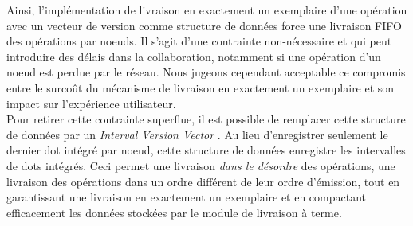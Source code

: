 Ainsi, l'implémentation de livraison en exactement un exemplaire d'une opération avec un vecteur de version comme structure de données force une livraison \ac{FIFO} des opérations par noeuds.
Il s'agit d'une contrainte non-nécessaire et qui peut introduire des délais dans la collaboration, notamment si une opération d'un noeud est perdue par le réseau.
Nous jugeons cependant acceptable ce compromis entre le surcoût du mécanisme de livraison en exactement un exemplaire et son impact sur l'expérience utilisateur.\\

Pour retirer cette contrainte superflue, il est possible de remplacer cette structure de données par un \emph{Interval Version Vector} \cite{2014-optimized-or-sets}.
Au lieu d'enregistrer seulement le dernier dot intégré par noeud, cette structure de données enregistre les intervalles de dots intégrés.
Ceci permet une livraison \emph{dans le désordre} des opérations, \ie une livraison des opérations dans un ordre différent de leur ordre d'émission, tout en garantissant une livraison en exactement un exemplaire et en compactant efficacement les données stockées par le module de livraison à terme.
